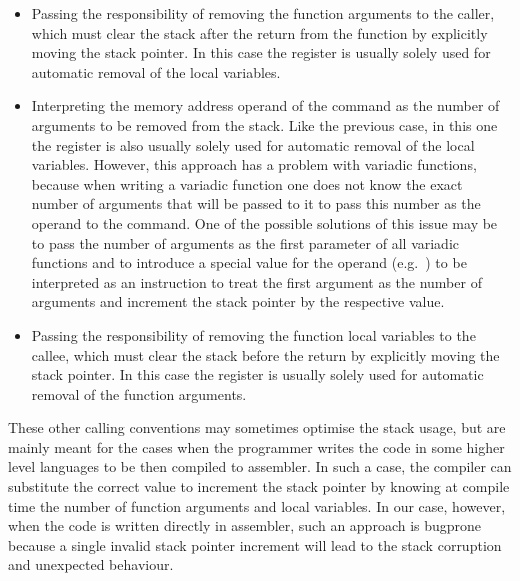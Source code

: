\begin{itemize}
    \item Passing the responsibility of removing the function arguments
    to the caller, which must clear the stack after the return from
    the function by explicitly moving the stack pointer.
    In this case the  register is usually solely used for automatic
    removal of the local variables.

    \item Interpreting the memory address operand of the  command
    as the number of arguments to be removed from the stack.
    Like the previous case, in this one the  register is also usually
    solely used for automatic removal of the local variables.
    However, this approach has a problem with variadic functions, because when
    writing a variadic function one does not know the exact number of arguments
    that will be passed to it to pass this number as the operand to the 
    command.
    One of the possible solutions of this issue may be to pass the number
    of arguments as the first parameter of all variadic functions and
    to introduce a special value for the  operand (e.g.\ )
    to be interpreted as an instruction to treat the first argument as
    the number of arguments and increment the stack pointer
    by the respective value.

    \item Passing the responsibility of removing the function local variables
    to the callee, which must clear the stack before the return
    by explicitly moving the stack pointer.
    In this case the  register is usually solely used for automatic
    removal of the function arguments.
\end{itemize}

These other calling conventions may sometimes optimise the stack usage,
but are mainly meant for the cases when the programmer writes the code in some
higher level languages to be then compiled to assembler.
In such a case, the compiler can substitute the correct value to increment
the stack pointer by knowing at compile time the number of function arguments
and local variables.
In our case, however, when the code is written directly in assembler, such
an approach is bugprone because a single invalid stack pointer increment
will lead to the stack corruption and unexpected behaviour.

